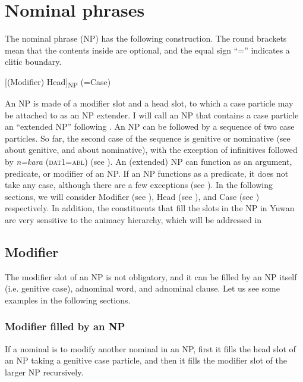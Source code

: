 \chapter{Nominal phrases}\label{chap:6}

The nominal phrase (NP) has the following construction. The round brackets mean that the contents inside are optional, and the equal sign “=” indicates a clitic boundary.

\ea{}
[(Modifier) Head]\textsubscript{NP} (=Case)
\z

An NP is made of a modifier slot and a head slot, to which a case particle may be attached to as an NP extender. I will call an NP that contains a case particle an “extended NP” following \citet[167]{Shimoji2008}. An NP can be followed by a sequence of two case particles. So far, the second case of the sequence is genitive or nominative (see  about genitive, and  about nominative), with the exception of infinitives followed by \textit{n=kara} (\textsc{dat}1=\textsc{abl}) (see ). An (extended) NP can function as an argument, predicate, or modifier of an NP. If an NP functions as a predicate, it does not take any case, although there are a few exceptions (see ). In the following sections, we will consider Modifier (see ), Head (see ), and Case (see ) respectively. In addition, the constituents that fill the slots in the NP in Yuwan are very sensitive to the animacy hierarchy, which will be addressed in 

\section{Modifier}

The modifier slot of an NP is not obligatory, and it can be filled by an NP itself (i.e. genitive case), adnominal word, and adnominal clause. Let us see some examples in the following sections.

\subsection{Modifier filled by an NP}

If a nominal is to modify another nominal in an NP, first it fills the head slot of an NP taking a genitive case particle, and then it fills the modifier slot of the larger NP recursively.

